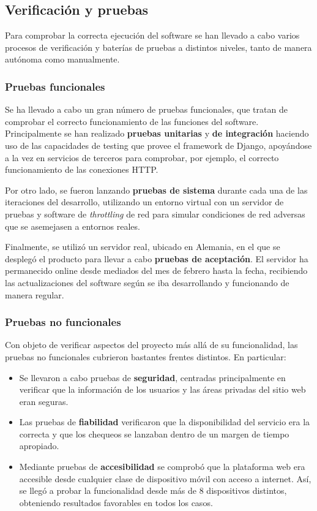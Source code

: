 \documentclass[a4paper,12pt]{article}
\begin{document}
\subsection{Verificación y pruebas}

Para comprobar la correcta ejecución del software se han llevado a cabo varios
procesos de verificación y baterías de pruebas a distintos niveles, tanto de
manera autónoma como manualmente.

\subsubsection{Pruebas funcionales}

Se ha llevado a cabo un gran número de pruebas funcionales, que tratan de
comprobar el correcto funcionamiento de las funciones del
software. Principalmente se han realizado \textbf{pruebas unitarias} y
\textbf{de integración} haciendo uso de las capacidades de testing que provee el
framework de Django, apoyándose a la vez en servicios de terceros para
comprobar, por ejemplo, el correcto funcionamiento de las conexiones HTTP.

Por otro lado, se fueron lanzando \textbf{pruebas de sistema} durante cada una
de las iteraciones del desarrollo, utilizando un entorno virtual con un servidor
de pruebas y software de \textit{throttling} de red para simular condiciones de
red adversas que se asemejasen a entornos reales.

Finalmente, se utilizó un servidor real, ubicado en Alemania, en el que se
desplegó el producto para llevar a cabo \textbf{pruebas de aceptación}. El
servidor ha permanecido online desde mediados del mes de febrero hasta la fecha,
recibiendo las actualizaciones del software según se iba desarrollando y
funcionando de manera regular.

\subsubsection{Pruebas no funcionales}

Con objeto de verificar aspectos del proyecto más allá de su funcionalidad, las
pruebas no funcionales cubrieron bastantes frentes distintos. En particular:

\begin{itemize}
\item Se llevaron a cabo pruebas de \textbf{seguridad}, centradas principalmente
  en verificar que la información de los usuarios y las áreas privadas del sitio
  web eran seguras.

\item Las pruebas de \textbf{fiabilidad} verificaron que la disponibilidad del
  servicio era la correcta y que los chequeos se lanzaban dentro de un margen de
  tiempo apropiado.

\item Mediante pruebas de \textbf{accesibilidad} se comprobó que la plataforma
  web era accesible desde cualquier clase de dispositivo móvil con acceso a
  internet. Así, se llegó a probar la funcionalidad desde más de 8 dispositivos
  distintos, obteniendo resultados favorables en todos los casos.

\end{itemize}
\end{document}

